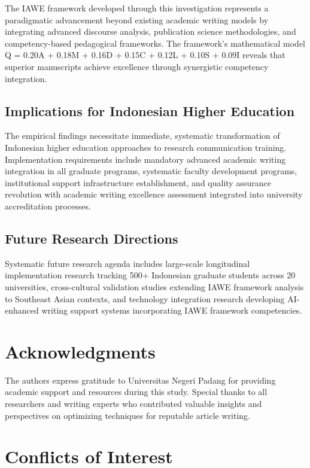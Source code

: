 \documentclass[journal,article,submit,pdftex,moreauthors]{Definitions/mdpi}
\begin{document}
The IAWE framework developed through this investigation represents a paradigmatic advancement beyond existing academic writing models by integrating advanced discourse analysis, publication science methodologies, and competency-based pedagogical frameworks. The framework's mathematical model Q = 0.20A + 0.18M + 0.16D + 0.15C + 0.12L + 0.10S + 0.09I reveals that superior manuscripts achieve excellence through synergistic competency integration.

\subsection{Implications for Indonesian Higher Education}

The empirical findings necessitate immediate, systematic transformation of Indonesian higher education approaches to research communication training. Implementation requirements include mandatory advanced academic writing integration in all graduate programs, systematic faculty development programs, institutional support infrastructure establishment, and quality assurance revolution with academic writing excellence assessment integrated into university accreditation processes.

\subsection{Future Research Directions}

Systematic future research agenda includes large-scale longitudinal implementation research tracking 500+ Indonesian graduate students across 20 universities, cross-cultural validation studies extending IAWE framework analysis to Southeast Asian contexts, and technology integration research developing AI-enhanced writing support systems incorporating IAWE framework competencies.

\section*{Acknowledgments}

The authors express gratitude to Universitas Negeri Padang for providing academic support and resources during this study. Special thanks to all researchers and writing experts who contributed valuable insights and perspectives on optimizing techniques for reputable article writing.

\section*{Conflicts of Interest}
\end{document}
